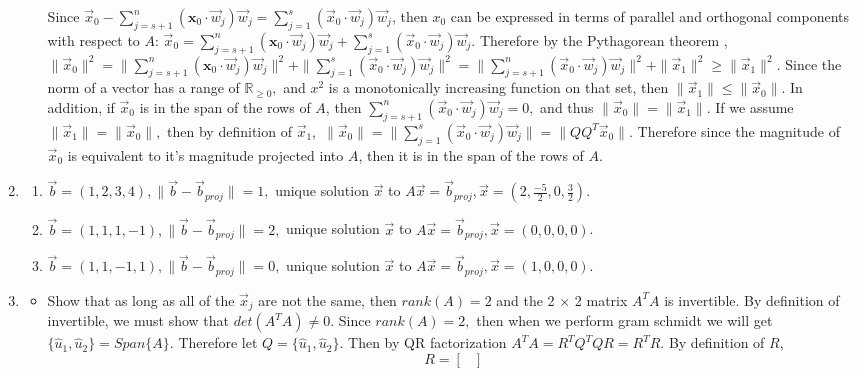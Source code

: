\documentclass[12pt, letterpaper]{article}
\newcommand{\R}{\mathbb{R}}
\begin{document}
\begin{enumerate}
\begin{itemize}
		Since $\vec{x}_0-\sum_{j=s+1}^n\left(\mathbf{x}_0 \cdot \vec{w}_j\right) \vec{w}_j=\sum_{j=1}^s\left(\vec{x}_0 \cdot \vec{w}_j\right) \vec{w}_j $, then $x_0$ can be expressed in terms of parallel and orthogonal components with respect to $A$: $\vec{x}_0= \sum_{j=s+1}^n\left(\mathbf{x}_0 \cdot \vec{w}_j\right) \vec{w}_j +\sum_{j=1}^s\left(\vec{x}_0 \cdot \vec{w}_j\right) \vec{w}_j $.  Therefore by the Pythagorean theorem ,  $\|\vec{x}_0\|^2= \|\sum_{j=s+1}^n\left(\mathbf{x}_0 \cdot \vec{w}_j\right) \vec{w}_j \|^2 +\|\sum_{j=1}^s\left(\vec{x}_0 \cdot \vec{w}_j\right) \vec{w}_j \|^2 = \|\sum_{j=s+1}^n\left(\vec{x}_0 \cdot \vec{w}_j\right) \vec{w}_j \|^2 + \|\vec{x}_1\|^2 \geq \|\vec{x}_1\|^2$.  Since the norm of a vector has a range of $\R_{\geq 0},$ and $x^2$ is a monotonically increasing function on that set, then $\|\vec{x}_1\| \leq \|\vec{x}_0\|$.  In addition, if $\vec{x}_0$ is in the span of the rows of $A$, then $\sum_{j=s+1}^n\left(\vec{x}_0 \cdot \vec{w}_j\right) \vec{w}_j = 0,$ and thus $\|\vec{x}_0\| = \|\vec{x}_1\|.$  If we assume $\|\vec{x}_1\| = \|\vec{x}_0\|,$ then by definition of $\vec{x}_1,$ $\|\vec{x}_0\| = \| \sum_{j=1}^s\left(\vec{x}_0 \cdot \vec{w}_j\right) \vec{w}_j \| = \|QQ^T \vec{x}_0\|.$  Therefore since the magnitude of $\vec{x}_0$ is equivalent to it's magnitude projected into $A$, then it is in the span of the rows of $A$.
		\end{itemize}
		\item 
			\begin{enumerate}
				\item $\vec{b} = (1,2,3,4), \|\vec{b} - \vec{b}_{proj}\| = 1, $ unique solution $\vec{x}$ to $A \vec{x} = \vec{b}_{proj}, \vec{x} = (2,\frac{-5}{2},0,\frac{3}{2})$. 
				\item $\vec{b} = (1,1,1,-1), \|\vec{b} - \vec{b}_{proj}\| = 2, $ unique solution $\vec{x}$ to $A \vec{x} = \vec{b}_{proj}, \vec{x} = (0,0,0,0)$.
				\item $\vec{b} = (1,1,-1,1), \|\vec{b} - \vec{b}_{proj}\| = 0, $ unique solution $\vec{x}$ to $A \vec{x} = \vec{b}_{proj}, \vec{x} = (1,0,0,0)$. 
			\end{enumerate}
		\item 
			\begin{itemize}
				\item Show that as long as all of the $\vec{x}_j$ are not the same, then $rank(A) = 2$
and the 2 × 2 matrix $A^T A$ is invertible.  By definition of invertible, we must show that $det(A^T A) \neq 0.$  Since $rank(A) = 2,$ then when we perform gram schmidt we will get $\{\hat{u}_1, \hat{u}_2\} = Span\{A\}.$  Therefore let $Q = \{\hat{u}_1, \hat{u}_2\}.$  Then by QR factorization $A^T A = R^T Q^T Q R = R^T R.$  By definition of $R$, \[R = \begin{bmatrix}

\end{bmatrix}\]
\end{itemize}
\end{enumerate}
\end{document}
